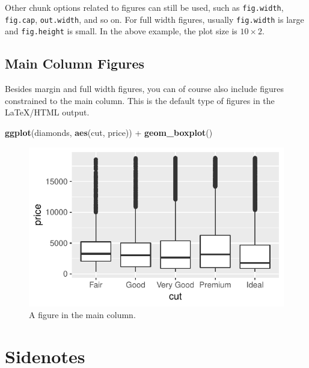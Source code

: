 \documentclass[]{tufte-handout}
\newenvironment{Shaded}{}{}
\newcommand{\KeywordTok}[1]{\textcolor[rgb]{0.00,0.44,0.13}{\textbf{#1}}}
\newcommand{\NormalTok}[1]{#1}
\newcommand{\OperatorTok}[1]{\textcolor[rgb]{0.40,0.40,0.40}{#1}}
\newcommand{\StringTok}[1]{\textcolor[rgb]{0.25,0.44,0.63}{#1}}
\begin{document}
Other chunk options related to figures can still be used, such as
\texttt{fig.width}, \texttt{fig.cap}, \texttt{out.width}, and so on. For
full width figures, usually \texttt{fig.width} is large and
\texttt{fig.height} is small. In the above example, the plot size is
\(10 \times 2\).

\hypertarget{main-column-figures}{%
\subsection{Main Column Figures}\label{main-column-figures}}

Besides margin and full width figures, you can of course also include
figures constrained to the main column. This is the default type of
figures in the LaTeX/HTML output.

\begin{Shaded}
\begin{Highlighting}[]
\KeywordTok{ggplot}\NormalTok{(diamonds, }\KeywordTok{aes}\NormalTok{(cut, price)) }\OperatorTok{+}\StringTok{ }\KeywordTok{geom_boxplot}\NormalTok{()}
\end{Highlighting}
\end{Shaded}

\begin{figure}
\includegraphics{Epi_Notes_files/figure-latex/fig-main-1} \caption[A figure in the main column]{A figure in the main column.}\label{fig:fig-main}
\end{figure}

\hypertarget{sidenotes}{%
\section{Sidenotes}\label{sidenotes}}
\end{document}
